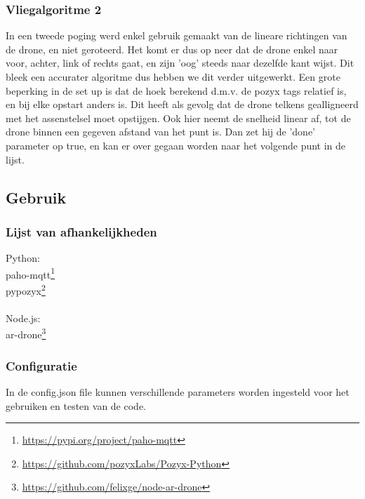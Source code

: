 \subsubsection{Vliegalgoritme 2}

In een tweede poging werd enkel gebruik gemaakt van de lineare richtingen van de drone, en niet geroteerd. Het komt er dus op neer dat de drone enkel naar voor, achter, link of rechts gaat, en zijn 'oog' steeds naar dezelfde kant wijst. Dit bleek een accurater algoritme dus hebben we dit verder uitgewerkt. Een grote beperking in de set up is dat de hoek berekend d.m.v. de pozyx tags relatief is, en bij elke opstart anders is. Dit heeft als gevolg dat de drone telkens gealligneerd met het assenstelsel moet opstijgen. Ook hier neemt de snelheid linear af, tot de drone binnen een gegeven afstand van het punt is. Dan zet hij de 'done' parameter op true, en kan er over gegaan worden naar het volgende punt in de lijst.

\subsection{Gebruik}

\subsubsection{Lijst van afhankelijkheden}

Python:\\
paho-mqtt\footnote{\url{https://pypi.org/project/paho-mqtt}}\\
pypozyx\footnote{\url{https://github.com/pozyxLabs/Pozyx-Python}}\\
\\
Node.js:\\
ar-drone\footnote{\url{https://github.com/felixge/node-ar-drone}}\\

\subsubsection{Configuratie}

In de config.json file kunnen verschillende parameters worden ingesteld voor het gebruiken en testen van de code. \\

